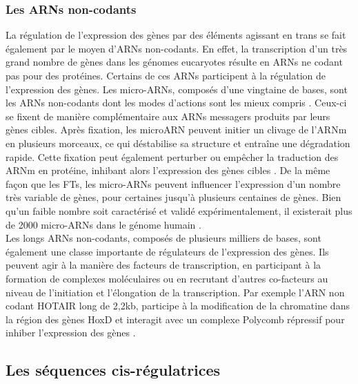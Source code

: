 \subsubsection{Les \acrshort{ARN}s non-codants}
\label{subsubsec:ARN-noncodant}

La régulation de l’expression des gènes par des éléments agissant en trans se fait également par le moyen d’\acrshort{ARN}s non-codants. En effet, la transcription d’un très grand nombre de gènes dans les génomes eucaryotes résulte en \acrshort{ARN}s ne codant pas pour des protéines. Certains de ces \acrshort{ARN}s participent à la régulation de l’expression des gènes. Les micro-\acrshort{ARN}s, composés d’une vingtaine de bases, sont les \acrshort{ARN}s non-codants dont les modes d’actions sont les mieux compris \citep{bartel_micrornas_2004}. Ceux-ci se fixent de manière complémentaire aux \acrshort{ARN}s messagers produits par leurs gènes cibles. Après fixation, les microARN peuvent initier un clivage de l’\acrshort{ARNm} en plusieurs morceaux, ce qui déstabilise sa structure et entraîne une dégradation rapide. Cette fixation peut également perturber ou empêcher la traduction des \acrshort{ARNm} en protéine, inhibant alors l’expression des gènes cibles \citep{bartel_micrornas_2004}. De la même façon que les \acrshort{FT}s, les micro-\acrshort{ARN}s peuvent influencer l’expression d’un nombre très variable de gènes, pour certaines jusqu’à plusieurs centaines de gènes. Bien qu’un faible nombre soit caractérisé et validé expérimentalement, il existerait plus de 2000 micro-\acrshort{ARN}s dans le génome humain \citep{alles_estimate_2019}.\\

Les longs \acrshort{ARN}s non-codants, composés de plusieurs milliers de bases, sont également une classe importante de régulateurs de l’expression des gènes. Ils peuvent agir à la manière des facteurs de transcription, en participant à la formation de complexes moléculaires ou en recrutant d’autres co-facteurs au niveau de l'initiation et l’élongation de la transcription. Par exemple l’ARN non codant HOTAIR long de 2,2kb, participe à la modification de la chromatine dans la région des gènes HoxD et interagit avec un complexe Polycomb répressif pour inhiber l’expression des gènes \citep{rinn_functional_2007}.

\subsection{Les séquences \gls{cis}-régulatrices}
\label{subsec:elem-cis}

